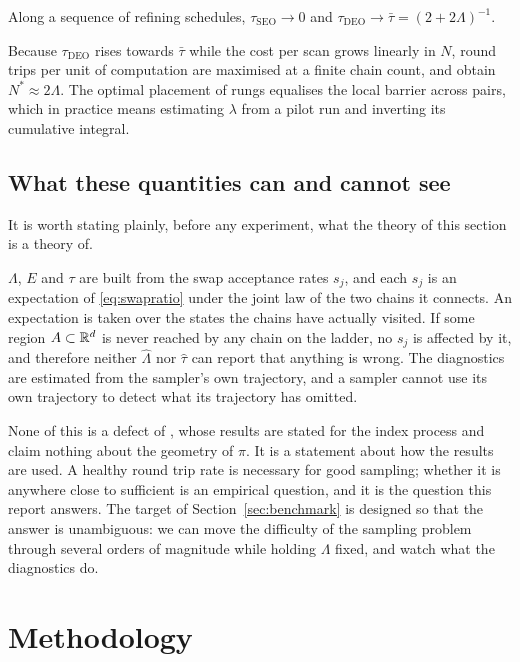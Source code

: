 \begin{theorem}
\label{thm:syed3}
Along a sequence of refining schedules,
$\tau_{\mathrm{SEO}}\to0$ and
$\tau_{\mathrm{DEO}}\to\bar\tau=(2+2\Lambda)^{-1}$.
\end{theorem}

Because $\tau_{\mathrm{DEO}}$ rises towards $\bar\tau$ while the cost per scan
grows linearly in $N$, round trips per unit of computation are maximised at a
finite chain count, and \citet{syed2022} obtain $N^\ast\approx2\Lambda$. The
optimal placement of rungs equalises the local barrier across pairs, which in
practice means estimating $\lambda$ from a pilot run and inverting its cumulative
integral.

\subsection{What these quantities can and cannot see}
\label{sec:whatcansee}

It is worth stating plainly, before any experiment, what the theory of this
section is a theory of.

$\Lambda$, $E$ and $\tau$ are built from the swap acceptance rates $s_j$, and
each $s_j$ is an expectation of \eqref{eq:swapratio} under the joint law of the
two chains it connects. An expectation is taken over the states the chains have
actually visited. If some region $A\subset\mathbb{R}^d$ is never reached by any chain on
the ladder, no $s_j$ is affected by it, and therefore neither $\hat\Lambda$ nor
$\hat\tau$ can report that anything is wrong. The diagnostics are estimated from
the sampler's own trajectory, and a sampler cannot use its own trajectory to
detect what its trajectory has omitted.

None of this is a defect of \citet{syed2022}, whose results are stated for the
index process and claim nothing about the geometry of $\pi$. It is a statement
about how the results are used. A healthy round trip rate is necessary for good
sampling; whether it is anywhere close to sufficient is an empirical question,
and it is the question this report answers. The target of
Section~\ref{sec:benchmark} is designed so that the answer is unambiguous: we can
move the difficulty of the sampling problem through several orders of magnitude
while holding $\Lambda$ fixed, and watch what the diagnostics do.


\section{Methodology}

